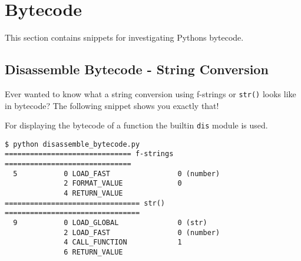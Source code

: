 
\section{Bytecode}

This section contains snippets for investigating Pythons bytecode.


\subsection{Disassemble Bytecode - String Conversion}

Ever wanted to know what a string conversion using f-strings or \lstinline{str()} looks like in bytecode?
The following snippet shows you exactly that!



For displaying the bytecode of a function the builtin \lstinline{dis} module is used.

\begin{lstlisting}[caption=Output of disassemble\_bytecode.py]
$ python disassemble_bytecode.py
============================== f-strings ==============================
  5           0 LOAD_FAST                0 (number)
              2 FORMAT_VALUE             0
              4 RETURN_VALUE
================================ str() ================================
  9           0 LOAD_GLOBAL              0 (str)
              2 LOAD_FAST                0 (number)
              4 CALL_FUNCTION            1
              6 RETURN_VALUE
\end{lstlisting}
